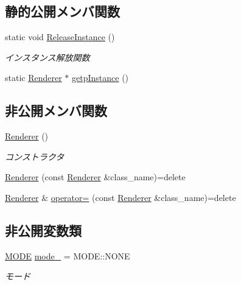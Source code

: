 \subsection*{静的公開メンバ関数}
\begin{DoxyCompactItemize}
\item 
static void \mbox{\hyperlink{class_renderer_aa7ac523172faaf376ecddaed4bdc0781}{Release\+Instance}} ()
\begin{DoxyCompactList}\small\item\em インスタンス解放関数 \end{DoxyCompactList}\item 
static \mbox{\hyperlink{class_renderer}{Renderer}} $\ast$ \mbox{\hyperlink{class_renderer_a995648604452c47b494de005b30de863}{getp\+Instance}} ()
\end{DoxyCompactItemize}
\subsection*{非公開メンバ関数}
\begin{DoxyCompactItemize}
\item 
\mbox{\hyperlink{class_renderer_a7ebf46f54dab9905f79b80f7fddb76a6}{Renderer}} ()
\begin{DoxyCompactList}\small\item\em コンストラクタ \end{DoxyCompactList}\item 
\mbox{\hyperlink{class_renderer_a1e7732f4c952f3c13d9bb03a7510b7aa}{Renderer}} (const \mbox{\hyperlink{class_renderer}{Renderer}} \&class\+\_\+name)=delete
\item 
\mbox{\hyperlink{class_renderer}{Renderer}} \& \mbox{\hyperlink{class_renderer_ab80abe5f35a095f221f8c43916900d66}{operator=}} (const \mbox{\hyperlink{class_renderer}{Renderer}} \&class\+\_\+name)=delete
\end{DoxyCompactItemize}
\subsection*{非公開変数類}
\begin{DoxyCompactItemize}
\item 
\mbox{\hyperlink{class_renderer_ab5a9379ccadcf2b3394c61cf8c835fec}{M\+O\+DE}} \mbox{\hyperlink{class_renderer_adaed44b3c6c8b0879b8cd52f677941cf}{mode\+\_\+}} = M\+O\+D\+E\+::\+N\+O\+NE
\begin{DoxyCompactList}\small\item\em モード \end{DoxyCompactList}\end{DoxyCompactItemize}
